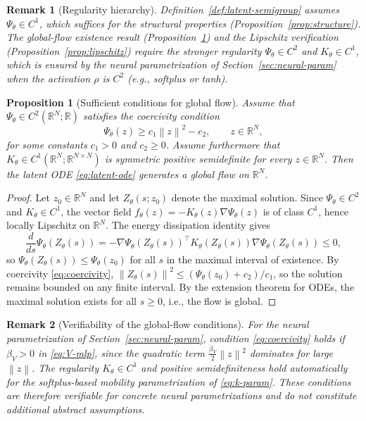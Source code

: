 \documentclass[11pt]{article}
\newtheorem{remark}{Remark}
\newtheorem{proposition}{Proposition}
\newcommand{\R}{\mathbb{R}}
\newcommand{\norm}[1]{\left\lVert #1 \right\rVert}
\begin{document}
\begin{remark}[Regularity hierarchy]\label{rem:regularity}
Definition~\ref{def:latent-semigroup} assumes $\Psi_{\theta}\in C^1$, which suffices for the structural properties (Proposition~\ref{prop:structure}). The global-flow existence result (Proposition~\ref{prop:global-flow}) and the Lipschitz verification (Proposition~\ref{prop:lipschitz}) require the stronger regularity $\Psi_{\theta}\in C^2$ and $K_{\theta}\in C^1$, which is ensured by the neural parametrization of Section~\ref{sec:neural-param} when the activation $\rho$ is $C^2$ (e.g., softplus or tanh).
\end{remark}

\begin{proposition}[Sufficient conditions for global flow]\label{prop:global-flow}
Assume that $\Psi_{\theta}\in C^2(\R^N;\R)$ satisfies the coercivity condition
\begin{equation}\label{eq:coercivity}
\Psi_{\theta}(z)\ge c_1\norm{z}^2-c_2, \qquad z\in \R^N,
\end{equation}
for some constants $c_1>0$ and $c_2\ge 0$. Assume furthermore that $K_{\theta}\in C^1(\R^N;\R^{N\times N})$ is symmetric positive semidefinite for every $z\in \R^N$. Then the latent ODE \eqref{eq:latent-ode} generates a global flow on $\R^N$.
\end{proposition}

\begin{proof}
Let $z_0\in \R^N$ and let $Z_{\theta}(s;z_0)$ denote the maximal solution. Since $\Psi_{\theta}\in C^2$ and $K_{\theta}\in C^1$, the vector field $f_{\theta}(z)=-K_{\theta}(z)\nabla \Psi_{\theta}(z)$ is of class $C^1$, hence locally Lipschitz on $\R^N$. The energy dissipation identity gives
\begin{equation*}
\frac{d}{ds}\Psi_{\theta}(Z_{\theta}(s))=-\nabla \Psi_{\theta}(Z_{\theta}(s))^{\top}K_{\theta}(Z_{\theta}(s))\nabla \Psi_{\theta}(Z_{\theta}(s))\le 0,
\end{equation*}
so $\Psi_{\theta}(Z_{\theta}(s))\le \Psi_{\theta}(z_0)$ for all $s$ in the maximal interval of existence. By coercivity \eqref{eq:coercivity}, $\norm{Z_{\theta}(s)}^2\le (\Psi_{\theta}(z_0)+c_2)/c_1$, so the solution remains bounded on any finite interval. By the extension theorem for ODEs, the maximal solution exists for all $s\ge 0$, i.e., the flow is global.
\end{proof}

\begin{remark}[Verifiability of the global-flow conditions]\label{rem:global-flow-verify}
For the neural parametrization of Section~\ref{sec:neural-param}, condition \eqref{eq:coercivity} holds if $\beta_V>0$ in \eqref{eq:V-mlp}, since the quadratic term $\frac{\beta_V}{2}\norm{z}^2$ dominates for large $\norm{z}$. The regularity $K_{\theta}\in C^1$ and positive semidefiniteness hold automatically for the softplus-based mobility parametrization of \eqref{eq:k-param}. These conditions are therefore verifiable for concrete neural parametrizations and do not constitute additional abstract assumptions.
\end{remark}
\end{document}
